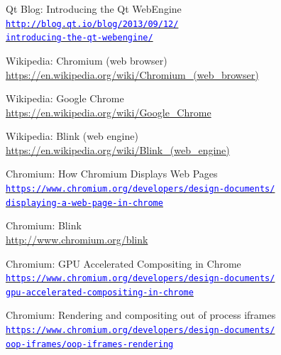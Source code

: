 \documentclass[12pt]{report}
\let\orighref\href
\renewcommand{\href}[2]{%
    \orighref{#1}{\textcolor{blue}{\texttt{#2}}}
}
\let\origurl\url
\renewcommand{\url}[1]{%
    \textcolor{blue}{\origurl{#1}}
}
\begin{document}
\begin{thebibliography}{9}

        Qt Blog: Introducing the Qt WebEngine \\
        \href{http://blog.qt.io/blog/2013/09/12/introducing-the-qt-webengine/}
        {http://blog.qt.io/blog/2013/09/12/\\
        introducing-the-qt-webengine/}

        Wikipedia: Chromium (web browser) \\
        \url{https://en.wikipedia.org/wiki/Chromium_(web_browser)}

        Wikipedia: Google Chrome \\
        \url{https://en.wikipedia.org/wiki/Google_Chrome}

        Wikipedia: Blink (web engine) \\
        \url{https://en.wikipedia.org/wiki/Blink_(web_engine)}

        Chromium: How Chromium Displays Web Pages \\
        \href{https://www.chromium.org/developers/design-documents/displaying-a-web-page-in-chrome}
        {https://www.chromium.org/developers/design-documents/\\
         displaying-a-web-page-in-chrome}

        Chromium: Blink \\
        \url{http://www.chromium.org/blink}

        Chromium: GPU Accelerated Compositing in Chrome \\
        \href{https://www.chromium.org/developers/design-documents/gpu-accelerated-compositing-in-chrome}
        {https://www.chromium.org/developers/design-documents/\\
        gpu-accelerated-compositing-in-chrome}

        Chromium: Rendering and compositing out of process iframes \\
        \href{https://www.chromium.org/developers/design-documents/oop-iframes/oop-iframes-rendering}
        {https://www.chromium.org/developers/design-documents/\\
        oop-iframes/oop-iframes-rendering}


\end{thebibliography}
\end{document}
